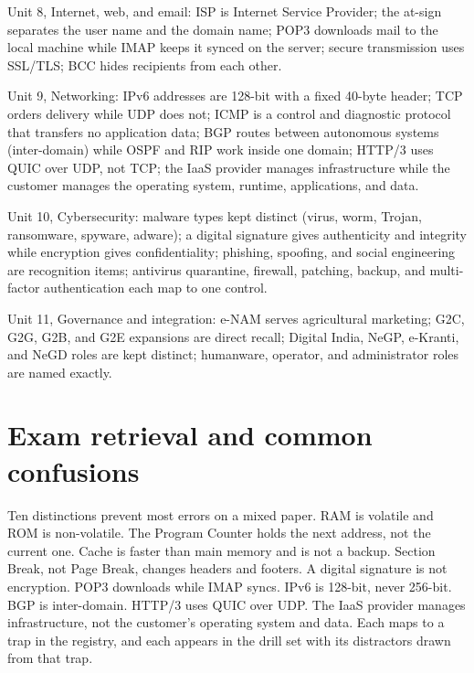 \documentclass[11pt]{article}
\begin{document}
Unit 8, Internet, web, and email: ISP is Internet Service Provider; the
at-sign separates the user name and the domain name; POP3 downloads mail to
the local machine while IMAP keeps it synced on the server; secure
transmission uses SSL/TLS; BCC hides recipients from each other.

Unit 9, Networking: IPv6 addresses are 128-bit with a fixed 40-byte header;
TCP orders delivery while UDP does not; ICMP is a control and diagnostic
protocol that transfers no application data; BGP routes between autonomous
systems (inter-domain) while OSPF and RIP work inside one domain; HTTP/3
uses QUIC over UDP, not TCP; the IaaS provider manages infrastructure while
the customer manages the operating system, runtime, applications, and data.

Unit 10, Cybersecurity: malware types kept distinct (virus, worm, Trojan,
ransomware, spyware, adware); a digital signature gives authenticity and
integrity while encryption gives confidentiality; phishing, spoofing, and
social engineering are recognition items; antivirus quarantine, firewall,
patching, backup, and multi-factor authentication each map to one control.

Unit 11, Governance and integration: e-NAM serves agricultural marketing;
G2C, G2G, G2B, and G2E expansions are direct recall; Digital India, NeGP,
e-Kranti, and NeGD roles are kept distinct; humanware, operator, and
administrator roles are named exactly.

\section{Exam retrieval and common confusions}
Ten distinctions prevent most errors on a mixed paper. RAM is volatile and
ROM is non-volatile. The Program Counter holds the next address, not the
current one. Cache is faster than main memory and is not a backup. Section
Break, not Page Break, changes headers and footers. A digital signature is
not encryption. POP3 downloads while IMAP syncs. IPv6 is 128-bit, never
256-bit. BGP is inter-domain. HTTP/3 uses QUIC over UDP. The IaaS provider
manages infrastructure, not the customer's operating system and data. Each
maps to a trap in the registry, and each appears in the drill set with its
distractors drawn from that trap.
\end{document}
